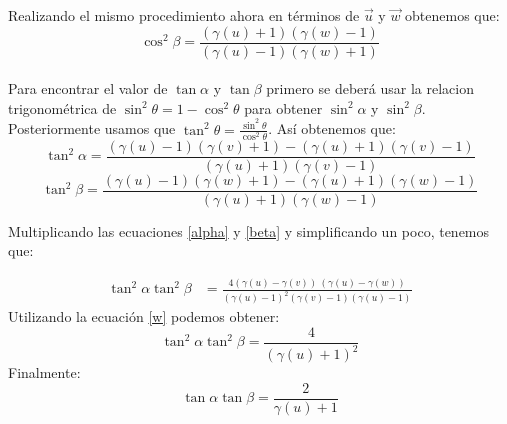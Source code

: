 \documentclass[0pt, letterpaper]{article}
\begin{document}
    Realizando el mismo procedimiento ahora en t\'erminos de $\Vec{u}$ y $\Vec{w}$ obtenemos que:
    \begin{equation}
        \cos^2\beta = \frac{(\gamma(u) + 1)(\gamma(w) - 1)}{(\gamma(u) - 1)(\gamma(w) + 1)}
    \end{equation}
    \\
    Para encontrar el valor de $\tan\alpha$ y $\tan\beta$ primero se deber\'a usar la relacion trigonom\'etrica de $\sin^2\theta = 1 - \cos^2\theta$ para obtener $\sin^2\alpha$ y $\sin^2\beta$. Posteriormente usamos que $\tan^2\theta = \frac{\sin^2\theta}{\cos^2\theta}$. As\'i obtenemos que:
    \begin{equation}\label{alpha}
        \tan^2\alpha = \frac{(\gamma(u) - 1)(\gamma(v) + 1) - (\gamma(u) + 1)(\gamma(v) - 1)}{(\gamma(u) + 1)(\gamma(v) - 1)}
    \end{equation}
        \begin{equation}\label{beta}
        \tan^2\beta = \frac{(\gamma(u) - 1)(\gamma(w) + 1) - (\gamma(u) + 1)(\gamma(w) - 1)}{(\gamma(u) + 1)(\gamma(w) - 1)}
    \end{equation}
    
    Multiplicando las ecuaciones \eqref{alpha} y \eqref{beta} y simplificando un poco, tenemos que:
    
    \begin{equation*}
        \begin{split}
            \tan^2\alpha\tan^2\beta &= \frac{4(\gamma(u) - \gamma(v)) \ (\gamma(u) - \gamma(w))}{(\gamma(u) - 1)^2(\gamma(v) - 1)(\gamma(u) - 1)}
        \end{split}
    \end{equation*}
    Utilizando la ecuaci\'on \eqref{w} podemos obtener:
    \begin{equation*}
        \tan^2\alpha\tan^2\beta = \frac{4}{(\gamma(u) + 1)^2}
    \end{equation*}
    Finalmente:
    \begin{equation}
        \boxed{\tan\alpha\tan\beta = \frac{2}{\gamma(u) + 1}}
    \end{equation}
\end{document}
